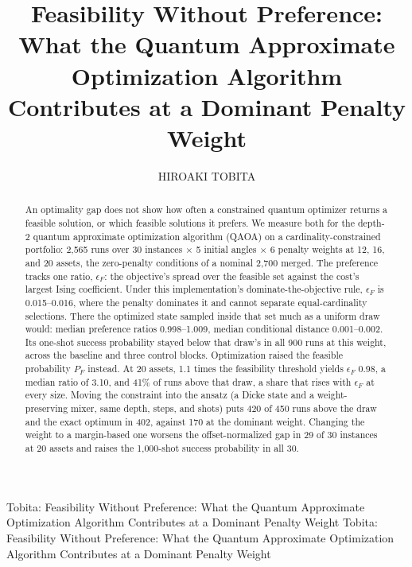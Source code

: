 \documentclass{ieeeaccess}
\begin{document}

\title{Feasibility Without Preference: What the Quantum Approximate Optimization Algorithm Contributes at a Dominant Penalty Weight}
\author{\uppercase{Hiroaki Tobita}}
\address[1]{Advanced Institute of Industrial Technology, Tokyo 140-0011, Japan (e-mail: tobita-hiroaki@aiit.ac.jp)}

\markboth
{Tobita: Feasibility Without Preference: What the Quantum Approximate Optimization Algorithm Contributes at a Dominant Penalty Weight}
{Tobita: Feasibility Without Preference: What the Quantum Approximate Optimization Algorithm Contributes at a Dominant Penalty Weight}




\begin{abstract}
An optimality gap does not show how often a constrained quantum optimizer returns a feasible solution, or which feasible solutions it prefers. We measure both for the depth-2 quantum approximate optimization algorithm (QAOA) on a cardinality-constrained portfolio: 2,565 runs over 30 instances $\times$ 5 initial angles $\times$ 6 penalty weights at 12, 16, and 20 assets, the zero-penalty conditions of a nominal 2,700 merged. The preference tracks one ratio, $\epsilon_{F}$: the objective's spread over the feasible set against the cost's largest Ising coefficient. Under this implementation's dominate-the-objective rule, $\epsilon_{F}$ is 0.015--0.016, where the penalty dominates it and cannot separate equal-cardinality selections. There the optimized state sampled inside that set much as a uniform draw would: median preference ratios 0.998--1.009, median conditional distance 0.001--0.002. Its one-shot success probability stayed below that draw's in all 900 runs at this weight, across the baseline and three control blocks. Optimization raised the feasible probability $P_{F}$ instead. At 20 assets, 1.1 times the feasibility threshold yields $\epsilon_{F}$ 0.98, a median ratio of 3.10, and 41\% of runs above that draw, a share that rises with $\epsilon_{F}$ at every size. Moving the constraint into the ansatz (a Dicke state and a weight-preserving mixer, same depth, steps, and shots) puts 420 of 450 runs above the draw and the exact optimum in 402, against 170 at the dominant weight. Changing the weight to a margin-based one worsens the offset-normalized gap in 29 of 30 instances at 20 assets and raises the 1,000-shot success probability in all 30.
\end{abstract}
\end{document}

